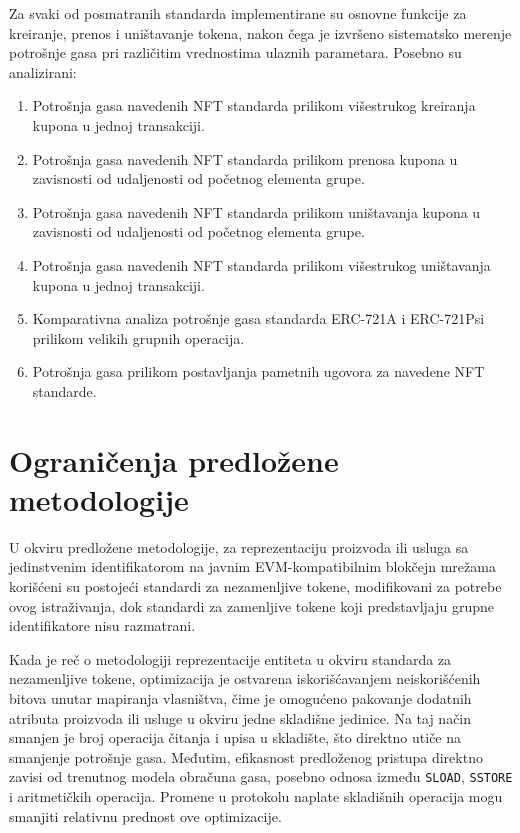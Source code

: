Za svaki od posmatranih standarda implementirane su osnovne funkcije za kreiranje, prenos i uništavanje tokena, nakon čega je izvršeno sistematsko merenje potrošnje gasa pri različitim vrednostima ulaznih parametara. Posebno su analizirani:
\begin{enumerate}
\item Potrošnja gasa navedenih NFT standarda prilikom višestrukog kreiranja kupona u jednoj transakciji.
\item Potrošnja gasa navedenih NFT standarda prilikom prenosa kupona u zavisnosti od udaljenosti od početnog elementa grupe.
\item Potrošnja gasa navedenih NFT standarda prilikom uništavanja kupona u zavisnosti od udaljenosti od početnog elementa grupe.
\item Potrošnja gasa navedenih NFT standarda prilikom višestrukog uništavanja kupona u jednoj transakciji.
\item Komparativna analiza potrošnje gasa standarda ERC-721A i ERC-721Psi prilikom velikih grupnih operacija.
\item Potrošnja gasa prilikom postavljanja pametnih ugovora za navedene NFT standarde.
\end{enumerate}

\section{Ograničenja predložene metodologije}
U okviru predložene metodologije, za reprezentaciju proizvoda ili usluga sa jedinstvenim identifikatorom na javnim EVM-kompatibilnim blokčejn mrežama korišćeni su postojeći standardi za nezamenljive tokene, modifikovani za potrebe ovog istraživanja, dok standardi za zamenljive tokene koji predstavljaju grupne identifikatore nisu razmatrani.

Kada je reč o metodologiji reprezentacije entiteta u okviru standarda za nezamenljive tokene, optimizacija je ostvarena iskorišćavanjem neiskorišćenih bitova unutar mapiranja vlasništva, čime je omogućeno pakovanje dodatnih atributa proizvoda ili usluge u okviru jedne skladišne jedinice. Na taj način smanjen je broj operacija čitanja i upisa u skladište, što direktno utiče na smanjenje potrošnje gasa. Međutim, efikasnost predloženog pristupa direktno zavisi od trenutnog modela obračuna gasa, posebno odnosa između \texttt{SLOAD}, \texttt{SSTORE} i aritmetičkih operacija. Promene u protokolu naplate skladišnih operacija mogu smanjiti relativnu prednost ove optimizacije.

